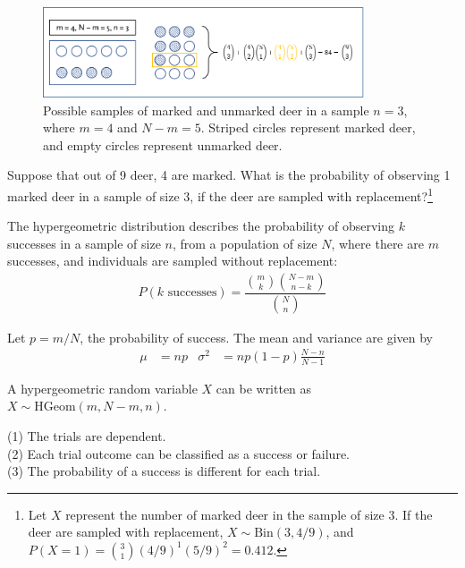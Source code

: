 \begin{figure}[h!]
	\centering
	\includegraphics[width=0.850\textwidth]
	{ch_distributions_oi_biostat/figures/hGeomSchematic/hGeomSchematic.png}
	\caption{Possible samples of marked and unmarked deer in a sample $n = 3$, where $m = 4$ and $N - m = 5$. Striped circles represent marked deer, and empty circles represent unmarked deer.}
	\label{hGeomSchematic}
\end{figure}

\begin{exercise} Suppose that out of 9 deer, 4 are marked. What is the probability of observing 1 marked deer in a sample of size 3, if the deer are sampled with replacement?\footnote{Let $X$ represent the number of marked deer in the sample of size 3. If the deer are sampled with replacement, $X \sim \textrm{Bin}(3, 4/9)$, and $P(X = 1) = { 3 \choose 1 } (4/9)^1 (5/9)^2 = 0.412$.}
\end{exercise}

\begin{termBox}{
		The hypergeometric distribution describes the probability of observing $k$ successes in a sample of size $n$, from a population of size $N$, where there are $m$ successes, and individuals are sampled without replacement:
		\begin{align*}
		P(k \textrm{ successes}) = \dfrac{{m \choose k} {N - m \choose n-k}}{{N \choose n}}
		\label{hypergeometricEquation}
		\end{align*}
		
		Let $p = m/N$, the probability of success. The mean and variance are given by\vspace{-2.5mm}
		\begin{align*}
		\mu &= np
		&\sigma^2&=np(1-p)\frac{N-n}{N-1}
		\end{align*}
		
		A hypergeometric random variable $X$ can be written as $X \sim \textrm{HGeom}(m, N-m, n)$.
	}
\end{termBox}

\begin{tipBox}{
		(1) The trials are dependent. \\
		(2) Each trial outcome can be classified as a success or failure. \\
		(3) The probability of a success is different for each trial. \\}
\end{tipBox}

